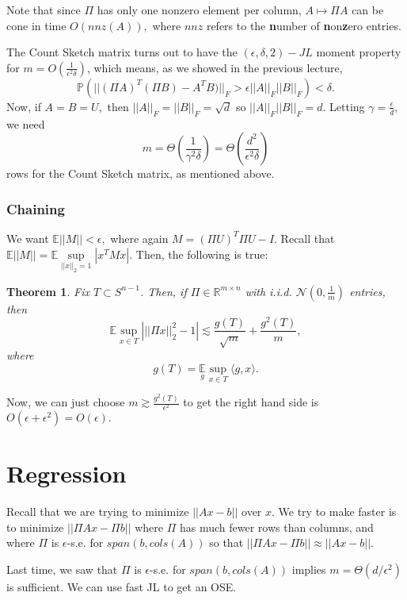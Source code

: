 \documentclass[11pt]{article}
\newtheorem{theorem}{Theorem}
\begin{document}
Note that since $\Pi$ has only one nonzero element per column, $A \mapsto \Pi A$ can be cone in time $O(nnz(A)),$ where $nnz$ refers to the \textbf{n}umber of \textbf{n}on\textbf{z}ero entries.

The Count Sketch matrix turns out to have the $(\epsilon, \delta, 2) - JL$ moment property for $m = O(\frac{1}{\epsilon^2 \delta})$, which means, as we showed in the previous lecture, $$\mathbb{P}\left(||(\Pi A)^T (\Pi B) - A^T B)||_F > \epsilon ||A||_F ||B||_F \right) < \delta.$$  Now, if $A = B = U,$ then $||A||_F = ||B||_F = \sqrt{d}$ so $||A||_F ||B||_F = d.$  Letting $\gamma = \frac{\epsilon}{d},$ we need $$m = \Theta\left(\frac{1}{\gamma^2 \delta}\right) = \Theta\left(\frac{d^2}{\epsilon^2 \delta}\right)$$ rows for the Count Sketch matrix, as mentioned above.

\subsubsection{Chaining}

We want $\mathbb{E} ||M|| < \epsilon,$ where again $M = (\Pi U)^T \Pi U - I.$  Recall that $\mathbb{E}||M|| = \mathbb{E} \sup\limits_{||x||_2 = 1} |x^T Mx|.$  Then, the following is true:

\begin{theorem} \cite{Gordon}
    Fix $T \subset S^{n-1}$.  Then, if $\Pi \in \mathbb{R}^{m \times n}$ with i.i.d. $\mathcal{N}(0, \frac{1}{m})$ entries, then $$\mathbb{E} \sup\limits_{x \in T} \left| ||\Pi x||_2^2 - 1\right| \lesssim \frac{g(T)}{\sqrt{m}} + \frac{g^2(T)}{m},$$ where $$g(T) = \mathbb{E}\limits_{g} \sup\limits_{x \in T} \langle g, x \rangle.$$
\end{theorem}

Now, we can just choose $m \gtrsim \frac{g^2(T)}{\epsilon^2}$ to get the right hand side is $O(\epsilon + \epsilon^2) = O(\epsilon).$

\section{Regression}

Recall that we are trying to minimize $||Ax-b||$ over $x$.  We try to make faster is to minimize $||\Pi Ax - \Pi b||$ where $\Pi$ has much fewer rows than columns, and where $\Pi$ is $\epsilon$-s.e. for $span(b, cols(A))$ so that $||\Pi Ax - \Pi b|| \approx ||Ax-b||$.

Last time, we saw that $\Pi$ is $\epsilon$-s.e. for $span(b, cols(A))$ implies $m = \Theta(d/\epsilon^2)$ is sufficient.  We can use fast JL to get an OSE.
\end{document}
